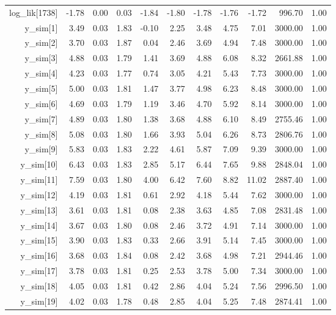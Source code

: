 \begin{table}[ht]
\begin{tabular}{rrrrrrrrrrr}
  log\_lik[1738] & -1.78 & 0.00 & 0.03 & -1.84 & -1.80 & -1.78 & -1.76 & -1.72 & 996.70 & 1.00 \\ 
  y\_sim[1] & 3.49 & 0.03 & 1.83 & -0.10 & 2.25 & 3.48 & 4.75 & 7.01 & 3000.00 & 1.00 \\ 
  y\_sim[2] & 3.70 & 0.03 & 1.87 & 0.04 & 2.46 & 3.69 & 4.94 & 7.48 & 3000.00 & 1.00 \\ 
  y\_sim[3] & 4.88 & 0.03 & 1.79 & 1.41 & 3.69 & 4.88 & 6.08 & 8.32 & 2661.88 & 1.00 \\ 
  y\_sim[4] & 4.23 & 0.03 & 1.77 & 0.74 & 3.05 & 4.21 & 5.43 & 7.73 & 3000.00 & 1.00 \\ 
  y\_sim[5] & 5.00 & 0.03 & 1.81 & 1.47 & 3.77 & 4.98 & 6.23 & 8.48 & 3000.00 & 1.00 \\ 
  y\_sim[6] & 4.69 & 0.03 & 1.79 & 1.19 & 3.46 & 4.70 & 5.92 & 8.14 & 3000.00 & 1.00 \\ 
  y\_sim[7] & 4.89 & 0.03 & 1.80 & 1.38 & 3.68 & 4.88 & 6.10 & 8.49 & 2755.46 & 1.00 \\ 
  y\_sim[8] & 5.08 & 0.03 & 1.80 & 1.66 & 3.93 & 5.04 & 6.26 & 8.73 & 2806.76 & 1.00 \\ 
  y\_sim[9] & 5.83 & 0.03 & 1.83 & 2.22 & 4.61 & 5.87 & 7.09 & 9.39 & 3000.00 & 1.00 \\ 
  y\_sim[10] & 6.43 & 0.03 & 1.83 & 2.85 & 5.17 & 6.44 & 7.65 & 9.88 & 2848.04 & 1.00 \\ 
  y\_sim[11] & 7.59 & 0.03 & 1.80 & 4.00 & 6.42 & 7.60 & 8.82 & 11.02 & 2887.40 & 1.00 \\ 
  y\_sim[12] & 4.19 & 0.03 & 1.81 & 0.61 & 2.92 & 4.18 & 5.44 & 7.62 & 3000.00 & 1.00 \\ 
  y\_sim[13] & 3.61 & 0.03 & 1.81 & 0.08 & 2.38 & 3.63 & 4.85 & 7.08 & 2831.48 & 1.00 \\ 
  y\_sim[14] & 3.67 & 0.03 & 1.80 & 0.08 & 2.46 & 3.72 & 4.91 & 7.14 & 3000.00 & 1.00 \\ 
  y\_sim[15] & 3.90 & 0.03 & 1.83 & 0.33 & 2.66 & 3.91 & 5.14 & 7.45 & 3000.00 & 1.00 \\ 
  y\_sim[16] & 3.68 & 0.03 & 1.84 & 0.08 & 2.42 & 3.68 & 4.98 & 7.21 & 2944.46 & 1.00 \\ 
  y\_sim[17] & 3.78 & 0.03 & 1.81 & 0.25 & 2.53 & 3.78 & 5.00 & 7.34 & 3000.00 & 1.00 \\ 
  y\_sim[18] & 4.05 & 0.03 & 1.81 & 0.42 & 2.86 & 4.04 & 5.24 & 7.56 & 2996.50 & 1.00 \\ 
  y\_sim[19] & 4.02 & 0.03 & 1.78 & 0.48 & 2.85 & 4.04 & 5.25 & 7.48 & 2874.41 & 1.00 \\ 

\end{tabular}
\end{table}
